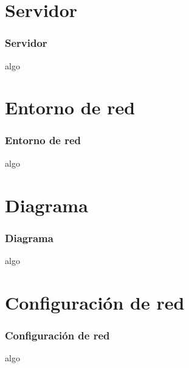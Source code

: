   
  
  
  
  
  
  
\section{Servidor}
  \begin{frame}
    \frametitle{Servidor}
    algo
  \end{frame}
\section{Entorno de red}
  \begin{frame}
    \frametitle{Entorno de red}
    algo
  \end{frame}
\section{Diagrama}
  \begin{frame}
    \frametitle{Diagrama}
    algo
  \end{frame}
\section{Configuraci\'on de red}
  \begin{frame}
    \frametitle{Configuraci\'on de red}
    algo
  \end{frame}
